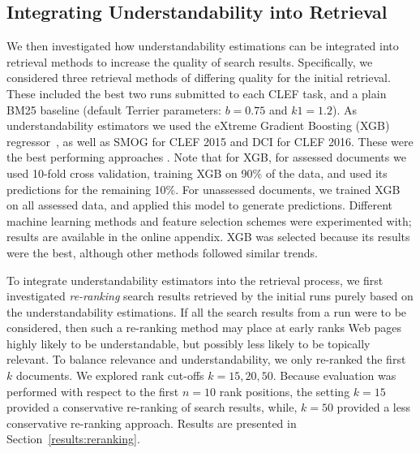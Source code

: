 \subsection{Integrating Understandability into Retrieval}
\label{sec:method_ltr}


We then investigated how understandability estimations can be integrated into retrieval methods to increase the quality of search results. %
Specifically, we considered three retrieval methods of differing quality for the initial retrieval. These included the best two runs submitted to each CLEF task, and a plain BM25 baseline (default Terrier parameters: $b=0.75$ and $k1=1.2$). As understandability estimators we used the eXtreme Gradient Boosting (XGB) regressor~\cite{chen16}, as well as SMOG for CLEF 2015 and DCI for CLEF 2016. These were the best performing approaches . Note that for XGB, for assessed documents we used 10-fold cross validation, training XGB on 90\% of the data, and used its predictions for the remaining 10\%. For unassessed documents, we trained XGB on all assessed data, and applied this model to generate predictions. Different machine learning methods and feature selection schemes were experimented with; results are available in the online appendix. XGB was selected because its results were the best, although other methods followed similar trends.


To integrate understandability estimators into the retrieval process, we first investigated \textit{re-ranking} search results retrieved by the initial runs purely based on the understandability estimations. 
If all the search results from a run were to be considered, then such a re-ranking method may place at early ranks Web pages highly likely to be understandable, but possibly less likely to be topically relevant. To balance relevance and understandability, we only re-ranked the first $k$ documents. We explored rank cut-offs $k = 15, 20, 50$. Because evaluation was performed with respect to the first $n=10$ rank positions, the setting $k=15$ provided a conservative re-ranking of search results, while, $k=50$ provided a less conservative re-ranking approach. Results are presented in Section~\ref{results:reranking}.

